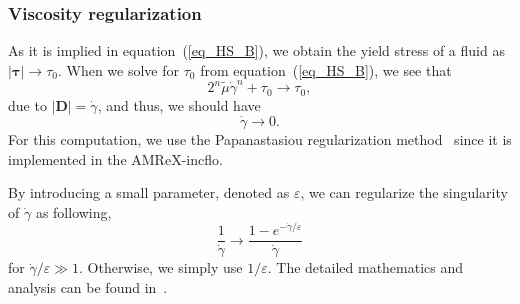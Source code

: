 \subsubsection{Viscosity regularization}
As it is implied in equation~(\ref{eq_HS_B}), we obtain the yield stress of a fluid as $|\bm{\tau}| \rightarrow \tau_0$. 
When we solve for $\tau_0$ from equation~(\ref{eq_HS_B}), we see that 
\begin{equation}
2^n \tilde{\mu} \dot{\gamma}^{n} + \tau_0
\rightarrow \tau_0,
\end{equation}
due to $|\bm{D}| = \dot{\gamma}$, and thus, we should have 
\begin{equation}
  \dot{\gamma} \rightarrow 0.
\end{equation}
For this computation, we use the Papanastasiou regularization method~\cite{papanastasiou_flows_1987} since it is implemented in the AMReX-incflo. 
\par
By introducing a small parameter, denoted as $\varepsilon$, we can regularize the singularity of $\dot{\gamma}$ as following,
\[
  \frac{1}{\dot{\gamma}} \rightarrow \frac{1-e^{-\dot{\gamma} / \varepsilon}}{\dot{\gamma}}  
\]
for $\dot{\gamma}/\varepsilon \gg 1$. Otherwise, we simply use $1/\varepsilon$. 
The detailed mathematics and analysis can be found in~\cite{sverdrup_highly_2018}.


